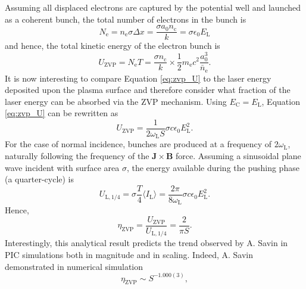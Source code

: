 Assuming all displaced electrons are captured by the potential well and launched as a coherent bunch, the total number of electrons in the bunch is
\begin{equation}\label{eq:zvp-Ne}
	N_\mathrm{e} = n_\mathrm{e} \sigma \Delta x = \frac{\sigma a_0 n_\mathrm{c}}{k}  = \sigma \epsilon_0 E_\mathrm{L}
\end{equation}
and hence, the total kinetic energy of the electron bunch is
\begin{equation}\label{eq:zvp_U}
	U_\mathrm{ZVP} = N_\mathrm{e} T = \frac{\sigma n_\mathrm{c}}{k}\times \frac{1}{2}m_\mathrm{e}c^2 \frac{a^3_0}{\bar{n}_\mathrm{e}}.
\end{equation}
It is now interesting to compare Equation \ref{eq:zvp_U} to the laser energy deposited upon the plasma surface and therefore consider what fraction of the laser energy can be absorbed via the \ac{ZVP} mechanism. Using $E_\mathrm{C} = E_\mathrm{L}$, Equation \ref{eq:zvp_U} can be rewritten as
\begin{equation}
	U_\mathrm{ZVP} = \frac{1}{2\omega_\mathrm{L} S}\sigma c \epsilon_0 E^2_\mathrm{L}.
\end{equation}
For the case of normal incidence, bunches are produced at a frequency of $2\omega_\mathrm{L}$, naturally following the frequency of the $\mathbf{J}\times \mathbf{B}$ force. Assuming a sinusoidal plane wave incident with surface area $\sigma$, the energy available during the pushing phase (a quarter-cycle) is
\begin{equation}
	U_\mathrm{L,1/4} = \sigma \frac{T}{4}\langle I_\mathrm{L}\rangle = \frac{2\pi}{8\omega_\mathrm{L}}\sigma c\epsilon_0E^2_\mathrm{L}.
\end{equation}
Hence,
\begin{equation}
	\eta_\mathrm{ZVP} = \frac{U_\mathrm{ZVP}}{U_\mathrm{L,1/4}} = \frac{2}{\pi S}.
\end{equation}
Interestingly, this analytical result predicts the trend observed by A. Savin \cite{savinModellingLaserPlasmaInteractions2019} in \ac{PIC} simulations both in magnitude and in scaling. Indeed, A. Savin demonstrated in numerical simulation
\begin{equation}
	\eta_\mathrm{ZVP} \sim S^{-1.000(3)},
\end{equation}
